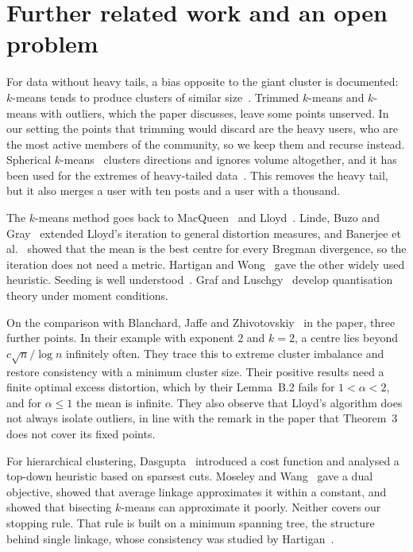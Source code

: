 \documentclass[11pt]{article}
\theoremstyle{remark}\newtheorem{remark}{Remark}\renewcommand{\theremark}{S\arabic{remark}}
\begin{document}
\section{Further related work and an open problem}\label{s:related}
For data without heavy tails, a bias opposite to the giant cluster is documented: $k$-means tends to produce clusters of similar size~\cite{xiong2009kmeans}. Trimmed $k$-means and $k$-means with outliers, which the paper discusses, leave some points unserved. In our setting the points that trimming would discard are the heavy users, who are the most active members of the community, so we keep them and recurse instead. Spherical $k$-means~\cite{hornik2012spherical} clusters directions and ignores volume altogether, and it has been used for the extremes of heavy-tailed data~\cite{janssen2020extremes}. This removes the heavy tail, but it also merges a user with ten posts and a user with a thousand.

The $k$-means method goes back to MacQueen~\cite{macqueen1967methods} and Lloyd~\cite{lloyd1982least}. Linde, Buzo and Gray~\cite{linde1980algorithm} extended Lloyd's iteration to general distortion measures, and Banerjee et al.~\cite{banerjee2005bregman} showed that the mean is the best centre for every Bregman divergence, so the iteration does not need a metric. Hartigan and Wong~\cite{hartigan1979kmeans} gave the other widely used heuristic. Seeding is well understood~\cite{arthur2007kmeanspp}. Graf and Luschgy~\cite{graf2000foundations} develop quantisation theory under moment conditions.

On the comparison with Blanchard, Jaffe and Zhivotovskiy~\cite{blanchard2026consistency} in the paper, three further points. In their example with exponent $2$ and $k=2$, a centre lies beyond $c\sqrt n/\log n$ infinitely often. They trace this to extreme cluster imbalance and restore consistency with a minimum cluster size. Their positive results need a finite optimal excess distortion, which by their Lemma~B.2 fails for $1<\alpha<2$, and for $\alpha\le1$ the mean is infinite. They also observe that Lloyd's algorithm does not always isolate outliers, in line with the remark in the paper that Theorem~3 does not cover its fixed points.

For hierarchical clustering, Dasgupta~\cite{dasgupta2016cost} introduced a cost function and analysed a top-down heuristic based on sparsest cuts. Moseley and Wang~\cite{moseley2017approximation} gave a dual objective, showed that average linkage approximates it within a constant, and showed that bisecting $k$-means can approximate it poorly. Neither covers our stopping rule. That rule is built on a minimum spanning tree, the structure behind single linkage, whose consistency was studied by Hartigan~\cite{hartigan1981single}.
\end{document}
